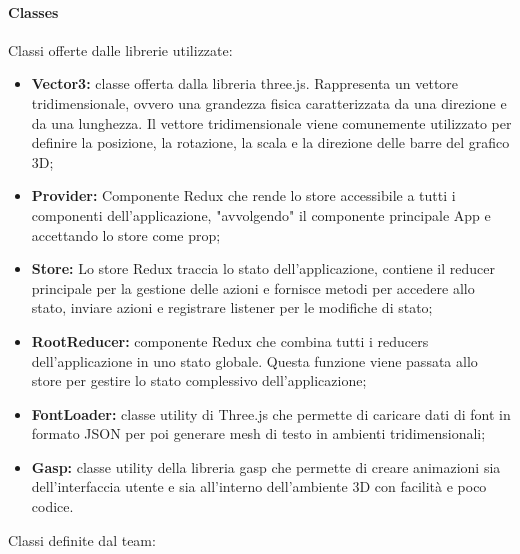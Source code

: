 \paragraph{Classes}
    Classi offerte dalle librerie utilizzate:
    \begin{itemize}
        \item \textbf{Vector3:} classe offerta dalla libreria three.js. Rappresenta un vettore tridimensionale, ovvero
        una grandezza fisica caratterizzata da una direzione e da una lunghezza. Il vettore tridimensionale
        viene comunemente utilizzato per definire la posizione, la rotazione, la scala e la direzione
        delle barre del grafico 3D;
        \item \textbf{Provider:} Componente Redux che rende lo store accessibile a tutti i componenti dell'applicazione, "avvolgendo" il componente principale App e accettando lo store come prop;
        \item \textbf{Store:} Lo store Redux traccia lo stato dell'applicazione, contiene il reducer principale per la gestione delle azioni e fornisce metodi per accedere allo stato,
        inviare azioni e registrare listener per le modifiche di stato;
        \item \textbf{RootReducer:} componente Redux che combina tutti i reducers dell’applicazione in uno stato
        globale. Questa funzione viene passata allo store per gestire lo stato complessivo dell’applicazione;
        \item \textbf{FontLoader:} classe utility di Three.js che permette di caricare dati di font in formato JSON per poi generare mesh di testo in ambienti tridimensionali;
        \item \textbf{Gasp:} classe utility della libreria gasp che permette di creare animazioni sia dell'interfaccia utente e sia all'interno dell'ambiente 3D con facilità e poco codice.
    \end{itemize}
    Classi definite dal team:
